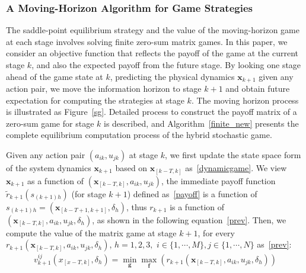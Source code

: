 \subsubsection{A Moving-Horizon Algorithm for Game Strategies}
\label{move_horizon}
The saddle-point equilibrium strategy and the value of the moving-horizon game at each stage involves solving finite zero-sum matrix games. 
In this paper, we consider an objective function that reflects the payoff of the game at the current stage $k$, and also the expected payoff from the future stage. By looking one stage ahead of the game state at $k$, predicting the physical dynamics $\mathbf{x}_{k+1}$ given any action pair, we move the information horizon to stage $k+1$ and obtain future expectation for computing the strategies at stage $k$. The moving horizon process is illustrated as Figure~\ref{sg}. 
Detailed process to construct the payoff matrix of a zero-sum game for stage $k$ is described, and Algorithm~\ref{finite_new} presents the complete equilibrium computation process of the hybrid stochastic game.
    
\iffalse When we calculate the expected value of the game at stage $k+1$, treat it as a termination. \fi
Given any action pair $(a_{ik},u_{jk})$ at stage $k$, we first update the state space form of the system dynamics $\mathbf{x}_{k+1}$ based on $\mathbf{x}_{[k-T,k]}$ as~\eqref{dynamicgame}. We view $\mathbf{x}_{k+1}$ as a function of $(\mathbf{x}_{[k-T, k]}, a_{ik},u_{jk})$, the immediate payoff function $\tilde{r}_{k+1} (s_{(k+1)h})$ (for stage $k+1$) defined as~\eqref{payoff} is a function of $s_{(k+1)h}=(\mathbf{x}_{[k-T+1,k+1]}, \delta_h)$, thus $r_{k+1}$ is a function of $(\mathbf{x}_{[k-T, k]}, a_{ik},u_{jk}, \delta_h)$, as shown in the following equation~\eqref{prev}.
Then, we compute the value of the matrix game at stage $k+1$, for every $r_{k+1}(\mathbf{x}_{[k-T,k]},a_{ik},u_{jk},\delta_h)$, $h=1,2,3,$ $i\in \{1,\cdots, M\}, j \in \{1,\cdots, N\}$ as~\eqref{prev}:
\begin{align}
v^{ij}_{k+1}(x_{[x-T,k]},\delta_h)= \min\limits_{\mathbf{g}}\max\limits_{\mathbf{f}}(r_{k+1}(\mathbf{x}_{[k-T,k]},a_{ik},u_{jk},\delta_h))
\label{prev}
\end{align}

